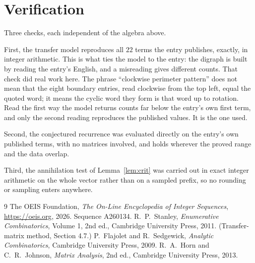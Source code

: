 \documentclass[11pt,a4paper]{article}
\theoremstyle{plain}
\theoremstyle{definition}
\begin{document}
\section{Verification}

Three checks, each independent of the algebra above.

First, the transfer model reproduces all $22$ terms the entry publishes, exactly, in
integer arithmetic. This is what ties the model to the entry: the digraph is built by reading
the entry's English, and a misreading gives different counts. That check did real work here. The phrase ``clockwise perimeter pattern'' does not mean that the eight boundary entries, read clockwise from the top left, equal the quoted word; it means the cyclic word they form is that word up to rotation. Read the first way the model returns counts far below the entry's own first term, and only the second reading reproduces the published values. It is the one used.

Second, the conjectured recurrence was evaluated directly on the entry's own published terms,
with no matrices involved, and holds wherever the proved range and the data overlap.

Third, the annihilation test of Lemma~\ref{lem:crit} was carried out in exact integer
arithmetic on the whole vector rather than on a sampled prefix, so no rounding or sampling
enters anywhere.

\begin{thebibliography}{9}
 The OEIS Foundation, \emph{The On-Line Encyclopedia of Integer
Sequences}, \url{https://oeis.org}, 2026. Sequence A260134.
 R.~P.~Stanley, \emph{Enumerative Combinatorics}, Volume 1, 2nd ed.,
Cambridge University Press, 2011. (Transfer-matrix method, Section 4.7.)
 P.~Flajolet and R.~Sedgewick, \emph{Analytic Combinatorics}, Cambridge
University Press, 2009.
 R.~A.~Horn and C.~R.~Johnson, \emph{Matrix Analysis}, 2nd ed., Cambridge
University Press, 2013.
\end{thebibliography}
\end{document}
